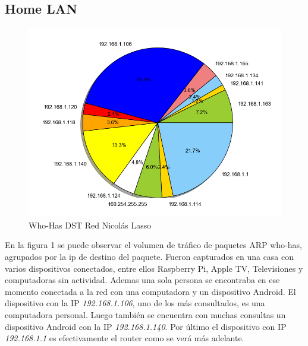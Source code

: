 \subsection{Home LAN}
\begin{center}
	\begin{figure}[ht]
    	\centering
		\includegraphics[width=12cm]{imgs/outputNicoLassoCasa_p-arp_who_dst-torta.png}
		\caption{Who-Has DST Red Nicolás Lasso}
	\end{figure}
\end{center}

\indent En la figura 1 se puede observar el volumen de tráfico de paquetes ARP who-has, agrupados por la ip de destino del paquete. 
Fueron capturados en una casa con varios dispositivos conectados, entre ellos Raspberry Pi, Apple TV, Televisiones y computadoras sin actividad. Ademas una sola persona se encontraba en ese momento conectada a la red con una computadora y un dispositivo Android. El dispositivo con la IP \textit{192.168.1.106}, uno de los más consultados, es una computadora personal. Luego también se encuentra con muchas consultas un dispositivo Android con la IP \textit{192.168.1.140}. Por último el dispositivo con IP \textit{192.168.1.1} es efectivamente el router como se verá más adelante.

\FloatBarrier

